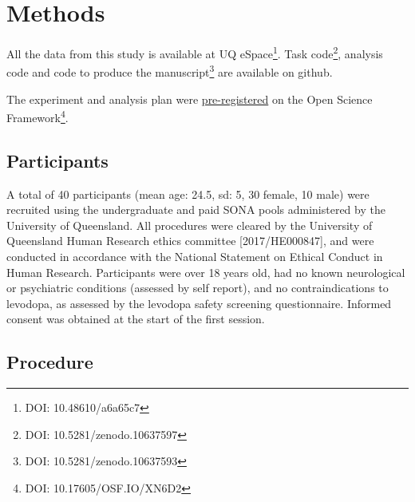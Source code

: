 \documentclass[
  man]{apa6}
\begin{document}
\hypertarget{methods}{%
\section{Methods}\label{methods}}

\label{sec:Methods}

All the data from this study is available at UQ eSpace\footnote{DOI: 10.48610/a6a65c7}. Task code\footnote{DOI: 10.5281/zenodo.10637597}, analysis code and code to produce the manuscript\footnote{DOI: 10.5281/zenodo.10637593} are available on github.

The experiment and analysis plan were \href{DOI:\%2010.17605/OSF.IO/XN6D2}{pre-registered} on the Open Science Framework\footnote{DOI: 10.17605/OSF.IO/XN6D2}.

\hypertarget{participants}{%
\subsection{Participants}\label{participants}}

\label{sec:Participants}

A total of 40 participants (mean age: 24.5, sd: 5, 30 female, 10 male) were recruited using the undergraduate and paid SONA pools administered by the University of Queensland. All procedures were cleared by the University of Queensland Human Research ethics committee {[}2017/HE000847{]}, and were conducted in accordance with the National Statement on Ethical Conduct in Human Research. Participants were over 18 years old, had no known neurological or psychiatric conditions (assessed by self report), and no contraindications to levodopa, as assessed by the levodopa safety screening questionnaire. Informed consent was obtained at the start of the first session.

\hypertarget{procedure}{%
\subsection{Procedure}\label{procedure}}

\label{sec:Procedure}
\end{document}
